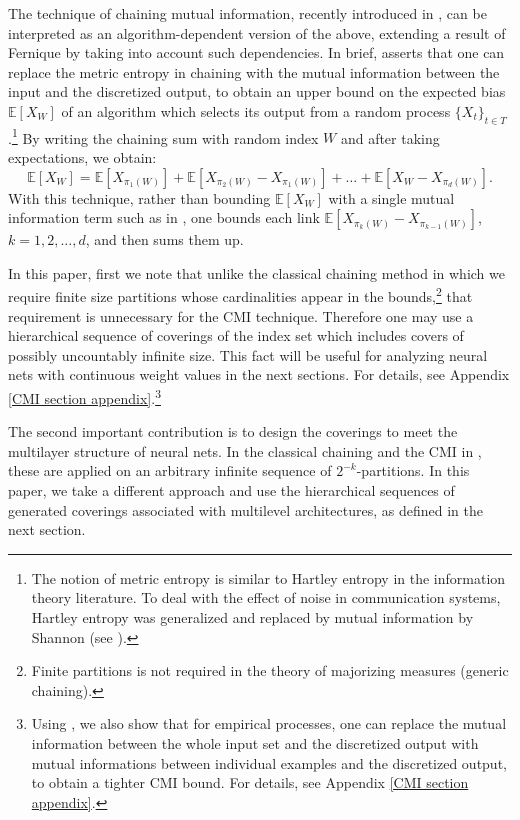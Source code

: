 \documentclass{article}
\newcommand{\E}{\mathbb{E}}
\begin{document}
The technique of chaining mutual information, recently introduced in \cite{asadi2018chaining}, can be interpreted as an  algorithm-dependent version of the above, extending a result of Fernique \cite{Fernique} by taking into account such dependencies. In brief, \cite{asadi2018chaining} asserts that one can replace the metric entropy in chaining with the mutual information between the input and the discretized output,  
to obtain an upper bound on the expected bias $\E[X_W]$ of an algorithm which selects its output from a random process $\{X_t\}_{t\in T}$.\footnote{The notion of metric entropy is similar to Hartley entropy in the information theory literature. To deal with the effect of noise in communication systems, Hartley entropy was generalized and replaced by mutual information by Shannon (see \cite{verdu1998fifty}).} By writing the chaining sum with random index $W$ and after taking expectations, we obtain:
\begin{equation}\label{CMI expectation sum}
 	\E \left[X_W\right]=\E\left[X_{\pi_1(W)}\right]+\E \left[X_{\pi_2(W)}-X_{\pi_1(W)} \right]+\dots+
 	\E\left[X_{W}-X_{\pi_d(W)} \right].
 \end{equation}  
With this technique, rather than bounding $\E \left[X_W\right]$ with a single mutual information term such as in \cite{russo2016controlling, xu2017information}, one bounds each link $\E \left[X_{\pi_{k}(W)}-X_{\pi_{k-1}(W)} \right]$, $k=1,2,\dots, d$, and then sums them up. 

In this paper, first we note that unlike the classical chaining method in which we require finite size partitions whose cardinalities appear in the bounds,\footnote{Finite partitions is not required in the theory of majorizing measures (generic chaining).}
that requirement is unnecessary for the CMI technique. Therefore one may use a hierarchical sequence of coverings of the index set which includes covers of possibly uncountably infinite size.  
 This fact will be useful for analyzing neural nets with continuous weight values in the next sections. For details, see Appendix \ref{CMI section appendix}.\footnote{Using \cite[Theorem 2]{bu2019tightening}, we also show that for empirical processes, one can replace the mutual information between the whole input set and the discretized output with mutual informations
 between individual examples and the discretized output, to obtain a tighter CMI bound. For details, see Appendix \ref{CMI section appendix}.
} 
 
 The second important contribution is to design the coverings to meet the multilayer structure of neural nets. In the classical chaining and the CMI in \cite{asadi2018chaining}, these are applied on an arbitrary infinite sequence of $2^{-k}$-partitions. In this paper, we take a different approach and use the hierarchical sequences of generated coverings associated with multilevel architectures, as defined in the next section.
 
\end{document}
